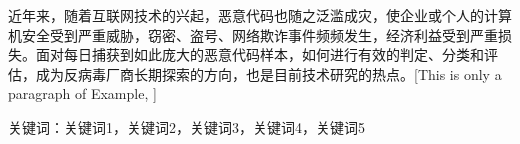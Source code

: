 近年来，随着互联网技术的兴起，恶意代码也随之泛滥成灾，使企业或个人的计算机安全受到严重威胁，窃密、盗号、网络欺诈事件频频发生，经济利益受到严重损失。面对每日捕获到如此庞大的恶意代码样本，如何进行有效的判定、分类和评估，成为反病毒厂商长期探索的方向，也是目前技术研究的热点。[This is only a paragraph of Example, ]



关键词：关键词1，关键词2，关键词3，关键词4，关键词5
